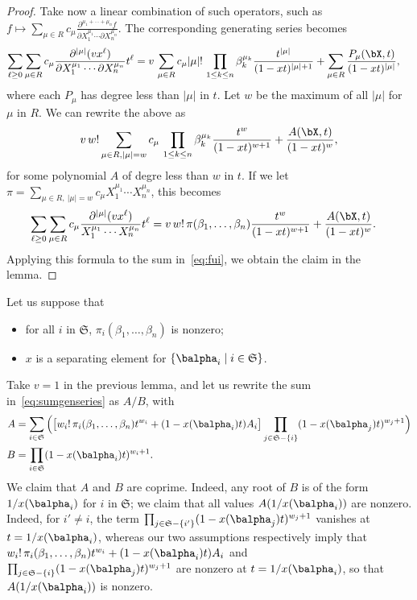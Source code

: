 \documentclass[12pt]{article}
\begin{document}
\begin{proof}
	Take now a linear combination of such operators, such as 
	$f \mapsto \sum_{\mu \in R} c_\mu \frac{ \partial^{\mu_1 +\cdots + \mu_n}  f } {\partial X_1^{\mu_1} \cdots
		\partial X_n^{\mu_n}}$. The corresponding generating series
	becomes
	\begin{align*}
	\sum_{\ell \ge 0} 
	\sum_{\mu \in R} c_\mu \frac{ \partial^{|\mu|} ( v x^\ell )} {\partial X_1^{\mu_1} \cdots
		\partial X_n^{\mu_n}}
	t^\ell 
	&=
	v\,\sum_{\mu \in R} c_\mu
	|\mu|!\, \prod_{1 \le k \le n} 
	\beta_k^{\mu_k}
	\frac {t^{|\mu|}}{(1-x t)^{|\mu|+1}} +\sum_{\mu \in R} \frac{P_\mu(\bX,t)}{(1-x t)^{|\mu|}},
	\end{align*}
	where each $P_\mu$ has degree less than $|\mu|$ in $t$.
	Let $w$ be the maximum of all $|\mu|$ for $\mu$ in $R$. We can rewrite 
	the above as
	\begin{align*}
	v\, w! 
	\sum_{\mu \in R, |\mu|=w} c_\mu
	\, \prod_{1 \le k \le n} 
	\beta_k^{\mu_k}
	\frac {t^{w}}{(1-x t)^{w+1}}
	+ \frac{A(\bX,t)}{(1-x t)^{w}},
	\end{align*}
	for some polynomial $A$ of degre less than $w$ in $t$. If we let 
	$\pi =\sum_{\mu \in R,\ |\mu|=w} c_{\mu} X_1^{\mu_1} \cdots
	X_n^{\mu_n}$, this becomes
	\begin{align*}
	\sum_{\ell \ge 0} 
	\sum_{\mu \in R} c_\mu \frac{ \partial^{|\mu|} ( v x^\ell )} { X_1^{\mu_1} \cdots
		X_n^{\mu_n}}
	t^\ell 
	&=
	v\, w! \,  \pi(\beta_1,\dots,\beta_n)
	\frac {t^{w}}{(1-x t)^{w+1}}
	+ \frac{A(\bX,t)}{(1-x t)^{w}}.
	\end{align*}
	Applying this formula to the sum in~\eqref{eq:fui}, we obtain the
	claim in the lemma.
\end{proof}

\noindent Let us suppose that
\begin{itemize}
	\item for all $i$ in $\mathfrak{S}$,  $ \pi_i(\beta_1,\dots,\beta_n)$ is nonzero;
	\item $x$ is a separating element for $ \{\balpha_i \mid i \in \mathfrak{S}\}$.
\end{itemize}
Take $v=1$ in the previous lemma, and
let us rewrite the sum in~\eqref{eq:sumgenseries} as $A/B$, with
\begin{align*}
A&=\sum_{i \in \mathfrak{S}} \Big(\big[
w_i!\, \pi_{i}(\beta_1,\dots,\beta_n)
t^{w_i} + (1-x(\balpha_i)    t)A_i\big]
\prod_{j \in \mathfrak{S}-\{i\}}(1-x(\balpha_j) t)^{w_{j}+1}\Big)
\\
B&=\prod_{i \in \mathfrak{S}}(1-x(\balpha_i) t)^{w_{i}+1}.
\end{align*}
We claim that $A$ and $B$ are coprime. Indeed, any root of $B$ is of
the form $1/x(\balpha_i)$ for $i$ in $\mathfrak{S}$; we claim that all
values $A(1/x(\balpha_i))$ are nonzero. Indeed, for $i' \ne i$, the
term $\prod_{j \in \mathfrak{S}-\{i'\}}(1-x(\balpha_j) t)^{w_{j}+1}$
vanishes at $t=1/x(\balpha_i)$, whereas our two assumptions
respectively imply that $ w_i!\, \pi_{i}(\beta_1,\dots,\beta_n)
t^{w_i} + (1-x(\balpha_i) t)A_i$ and $\prod_{j \in
	\mathfrak{S}-\{i\}}(1-x(\balpha_j) t)^{w_{j}+1}$
are nonzero at  $t=1/x(\balpha_i)$, so that $A(1/x(\balpha_i))$ is nonzero.
\end{document}
